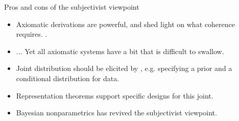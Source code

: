 \documentclass[10pt]{beamer}
\begin{document}




\begin{frame}{Pros and cons of the subjectivist viewpoint}
\begin{itemize}
  \item Axiomatic derivations are powerful, and shed light on what coherence requires. .
  \vfill
  \item[\frownie] ... Yet all axiomatic systems have a bit that is difficult to swallow.
  \vfill
  \item Joint distribution should be elicited by , e.g. specifying a prior and a conditional distribution for data.
  \vfill
  \item Representation theorems support specific designs for this joint.
  \vfill
  \item Bayesian nonparametrics has revived the subjectivist viewpoint.
\end{itemize}

\end{frame}
\end{document}
